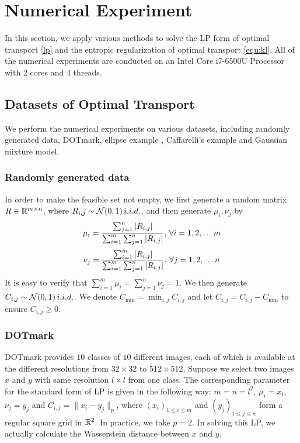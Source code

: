 \section{Numerical Experiment}
\label{sec:4}
In this section, we apply various methods to solve the LP form of optimal transport \ref{lp} and the entropic regularization of optimal transport \ref{equ:kl}. All of the numerical experiments are conducted on an Intel Core i7-6500U Processor with 2 cores and 4 threads.

\subsection{Datasets of Optimal Transport}
We perform the numerical experiments on various datasets, including randomly generated data, DOTmark\cite{DOTmark}, ellipse example \cite{multiscale}, Caffarelli's example \cite{multiscale} and Gaussian mixture model. 

\subsubsection{Randomly generated data}
In order to make the feasible set not empty, we first generate a random matrix $R\in \mathbb{R}^{m\times n}$, where $R_{i,j}\sim \mathcal{N}(0,1)\, i.i.d.$. and then generate $\mu_i, \nu_j$ by
$$
\mu_i=\frac{\sum_{j=1}^n|R_{i,j}|}{\sum_{i=1}^m\sum_{j=1}^n|R_{i,j}|}, \, \forall i=1, 2, \dots m\\
$$
$$
\nu_j=\frac{\sum_{i=1}^m|R_{i,j}|}{\sum_{i=1}^m\sum_{j=1}^n|R_{i,j}|}, \, \forall j=1, 2, \dots n\\
$$
It is easy to verify that $\sum_{i=1}^m\mu_i=\sum_{j=1}^n\nu_j=1$. We then generate $C_{i,j} \sim \mathcal{N}(0,1)\, i.i.d.$. We denote $C_{\mathrm{min}}=\min_{i,j}C_{i,j}$ and let $C_{i,j}=C_{i,j}-C_{\mathrm{min}}$ to ensure $C_{i,j}\geq 0$. 

\subsubsection{DOTmark}
DOTmark \cite{DOTmark} provides $10$ classes of $10$ different images, each of which is available at the different resolutions from $32\times32$ to $512\times512$. Suppose we select two images $x$ and $y$ with same resolution $l\times l$ from one class. The corresponding parameter for the standard form of LP is given in the following way: $m=n=l^2$, $\mu_i=x_i$, $\nu_j=y_j$ and $C_{i,j}=\|x_i-y_j\|_p$, where $(x_i)_{1\leq i\leq m}$ and $(y_j)_{1\leq j\leq n}$ form a regular square grid in $\mathbb{R}^2$. In practice, we take $p=2$. In solving this LP, we actually calculate the Wasserstein distance between $x$ and $y$.

